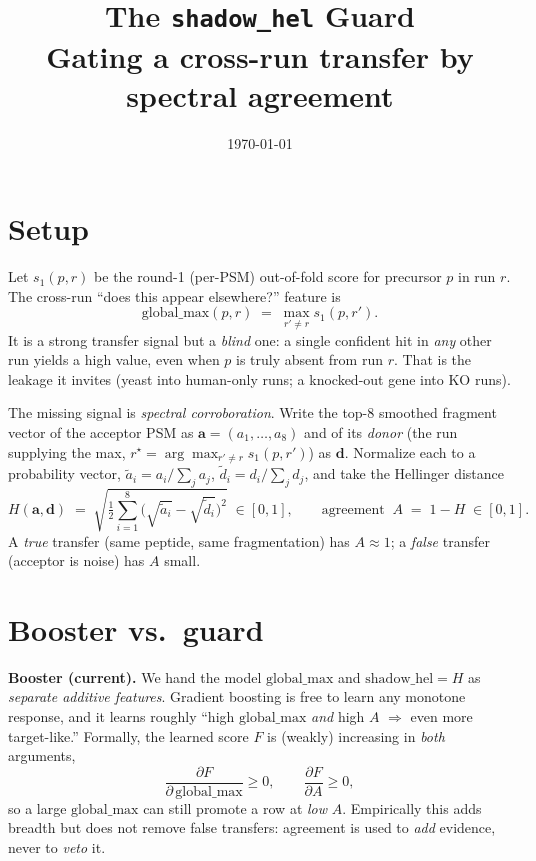 \documentclass[11pt]{article}
\title{\vspace{-1.4cm}\textbf{The \texttt{shadow\_hel} Guard}\\[2pt]
\large Gating a cross-run transfer by spectral agreement}
\author{}\date{\today}
\begin{document}
\maketitle\vspace{-1.1cm}

\section{Setup}
Let $s_1(p,r)$ be the round-1 (per-PSM) out-of-fold score for precursor $p$ in run $r$. The cross-run
``does this appear elsewhere?'' feature is
\[
\mathrm{global\_max}(p,r) \;=\; \max_{r'\neq r} s_1(p,r').
\]
It is a strong transfer signal but a \emph{blind} one: a single confident hit in \emph{any} other run
yields a high value, even when $p$ is truly absent from run $r$. That is the leakage it invites
(yeast into human-only runs; a knocked-out gene into KO runs).

The missing signal is \emph{spectral corroboration}. Write the top-8 smoothed fragment vector of the
acceptor PSM as $\mathbf{a}=(a_1,\dots,a_8)$ and of its \emph{donor} (the run supplying the max,
$r^\star=\arg\max_{r'\neq r}s_1(p,r')$) as $\mathbf{d}$. Normalize each to a probability vector,
$\tilde a_i = a_i/\!\sum_j a_j$, $\tilde d_i = d_i/\!\sum_j d_j$, and take the Hellinger distance
\[
H(\mathbf{a},\mathbf{d}) \;=\; \sqrt{\tfrac12\sum_{i=1}^{8}\bigl(\sqrt{\tilde a_i}-\sqrt{\tilde d_i}\bigr)^2}\;\in[0,1],
\qquad \text{agreement}\;\; A \;=\; 1-H \;\in[0,1].
\]
A \emph{true} transfer (same peptide, same fragmentation) has $A\approx1$; a \emph{false} transfer
(acceptor is noise) has $A$ small.

\section{Booster vs.\ guard}
\textbf{Booster (current).} We hand the model $\mathrm{global\_max}$ and $\mathrm{shadow\_hel}=H$ as
\emph{separate additive features}. Gradient boosting is free to learn any monotone response, and it
learns roughly ``high $\mathrm{global\_max}$ \emph{and} high $A$ $\Rightarrow$ even more target-like.''
Formally, the learned score $F$ is (weakly) increasing in \emph{both} arguments,
\[
\frac{\partial F}{\partial\,\mathrm{global\_max}}\ge 0,\qquad \frac{\partial F}{\partial A}\ge 0 ,
\]
so a large $\mathrm{global\_max}$ can still promote a row at \emph{low} $A$. Empirically this adds
breadth but does not remove false transfers: agreement is used to \emph{add} evidence, never to
\emph{veto} it.
\end{document}
